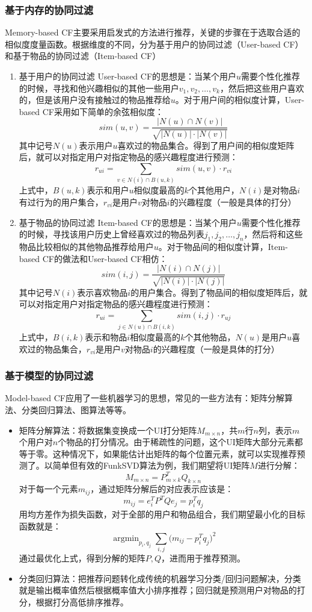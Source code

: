 \documentclass{article}
\begin{document}
		\subsubsection{基于内存的协同过滤}
		Memory-based CF主要采用启发式的方法进行推荐，关键的步骤在于选取合适的相似度度量函数。根据维度的不同，分为基于用户的协同过滤（User-based CF）和基于物品的协同过滤（Item-based CF）
		\begin{enumerate}
			\item 基于用户的协同过滤
			User-based CF的思想是：当某个用户$u$需要个性化推荐的时候，寻找和他兴趣相似的其他一些用户$v_1,v_2,\ldots,v_k$，然后把这些用户喜欢的，但是该用户没有接触过的物品推荐给$u$。对于用户间的相似度计算，User-based CF采用如下简单的余弦相似度：
			$$sim(u,v)=\frac{|N(u)\cap N(v)|}{\sqrt{|N(u)|\cdot|N(v)|}}$$
			其中记号$N(u)$表示用户$u$喜欢过的物品集合。得到了用户间的相似度矩阵后，就可以对指定用户对指定物品的感兴趣程度进行预测：
			$$r_{ui} = \sum\limits_{v\in N(i)\cap B(u,k)}sim(u,v)\cdot r_{vi}$$
			上式中，$B(u,k)$表示和用户$u$相似度最高的$k$个其他用户，$N(i)$是对物品$i$有过行为的用户集合，$r_{vi}$是用户$v$对物品$i$的兴趣程度（一般是具体的打分）
			\item 基于物品的协同过滤
			Item-based CF的思想是：当某个用户$u$需要个性化推荐的时候，寻找该用户历史上曾经喜欢过的物品列表$j_1,j_2,\ldots, j_n$，然后将和这些物品比较相似的其他物品推荐给用户$u$。对于物品间的相似度计算，Item-based CF的做法和User-based CF相仿：
			$$sim(i,j)=\frac{|N(i)\cap N(j)|}{\sqrt{|N(i)|\cdot|N(j)|}}$$
			其中记号$N(i)$表示喜欢物品$i$的用户集合。得到了物品间的相似度矩阵后，就可以对指定用户对指定物品的感兴趣程度进行预测：
			$$r_{ui} = \sum\limits_{j\in N(u)\cap B(i,k)}sim(i,j)\cdot r_{uj}$$
			上式中，$B(i,k)$表示和物品$i$相似度最高的$k$个其他物品，$N(u)$是用户$u$喜欢过的物品集合，$r_{vi}$是用户$v$对物品$i$的兴趣程度（一般是具体的打分）
		\end{enumerate}

		\subsubsection{基于模型的协同过滤}
		Model-based CF应用了一些机器学习的思想，常见的一些方法有：矩阵分解算法、分类回归算法、图算法等等。
		\begin{itemize}
			\item 矩阵分解算法：将数据集变换成一个UI打分矩阵$M_{m\times n}$，共$m$行$n$列，表示$m$个用户对$n$个物品的打分情况。由于稀疏性的问题，这个UI矩阵大部分元素都等于零。这种情况下，如果能估计出矩阵的每个位置元素，就可以实现推荐预测了。以简单但有效的FunkSVD算法为例，我们期望将UI矩阵$M$进行分解：
			$$M_{m\times n}=P^T_{m\times k}Q_{k\times n}$$
			对于每一个元素$m_{ij}$，通过矩阵分解后的对应表示应该是：
			$$m_{ij} = e_i^TP^TQe_j = p_i^Tq_j$$用均方差作为损失函数，对于全部的用户和物品组合，我们期望最小化的目标函数就是：
			$$\mathop{argmin}_{p_i,q_j}\sum_{i,j}\big(m_{ij}-p_i^Tq_j\big)^2$$
			通过最优化上式，得到分解的矩阵$P,Q$，进而用于推荐预测。
			\item 分类回归算法：把推荐问题转化成传统的机器学习分类/回归问题解决，分类就是输出概率值然后根据概率值大小排序推荐；回归就是预测用户对物品的打分，根据打分高低排序推荐。
		\end{itemize}
\end{document}
